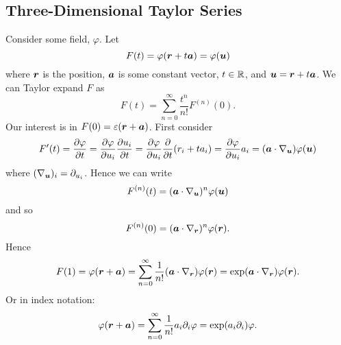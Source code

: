 \subsection{Three-Dimensional Taylor Series}
Consider some field, \(\varphi\).
Let
\[F(t) = \varphi(\bm{r} + t\bm{a}) = \varphi(\bm{u})\]
where \(\bm{r}\) is the position, \(\bm{a}\) is some constant vector, \(t\in\mathbb{R}\), and \(\bm{u} = \bm{r} + t\bm{a}\).
We can Taylor expand \(F\) as
\[F(t) = \sum_{n=0}^{\infty}\frac{t^n}{n!}F^{(n)}(0).\]
Our interest is in \(F(0) = \varepsilon(\bm{r} + \bm{a})\).
First consider
\[F'(t) = \pdv{\varphi}{t} = \pdv{\varphi}{u_i}\pdv{u_i}{t} = \pdv{\varphi}{u_i}\pdv{t}(r_i + ta_i) = \pdv{\varphi}{u_i}a_i = (\bm{a}\cdot\nabla_{\bm{u}})\varphi(\bm{u})\]
where \((\nabla_{\bm{u}})_i = \partial_{u_i}\).
Hence we can write
\[F^{(n)}(t) = (\bm{a}\cdot\nabla_{\bm{u}})^n\varphi(\bm{u})\]
and so
\[F^{(n)}(0) = (\bm{a}\cdot\nabla_{\bm{r}})^n\varphi(\bm{r}).\]
Hence
\[F(1) = \varphi(\bm{r} + \bm{a}) = \sum_{n=0}^{\infty}\frac{1}{n!}(\bm{a}\cdot\nabla_{\bm{r}})\varphi(\bm{r}) = \exp(\bm{a}\cdot\nabla_{\bm{r}})\varphi(\bm{r}).\]
Or in index notation:
\[\varphi(\bm{r} + \bm{a}) = \sum_{n=0}^{\infty}\frac{1}{n!} a_i\partial_i\varphi = \exp(a_i\partial_i)\varphi.\]

